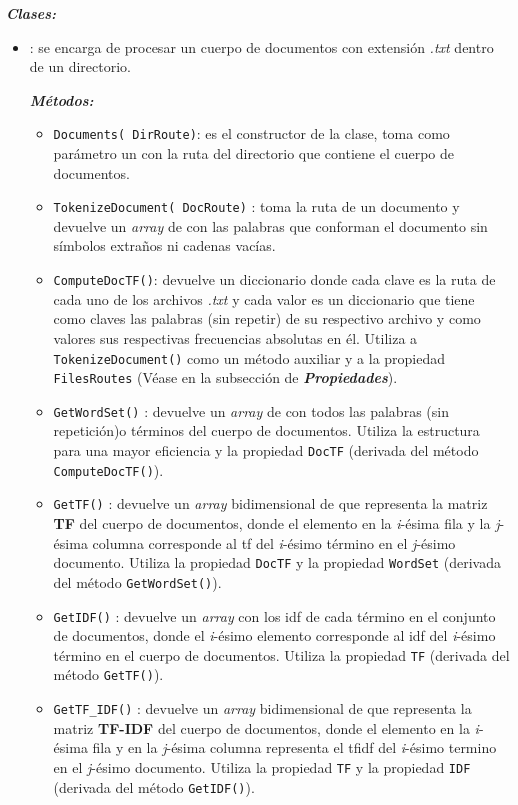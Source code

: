 \documentclass{article}
\begin{document}
\textbf{\textit{Clases:}}
\begin{itemize}
\item {} : se encarga de procesar un cuerpo de documentos con extensión \textit{.txt} dentro de un directorio.

\textbf{\textit{Métodos:}}
\begin{itemize}
\item \texttt{Documents( \texttt{DirRoute})}: es el constructor de la clase, toma como parámetro un  con la ruta del directorio que contiene el cuerpo de documentos. 
\item \texttt{TokenizeDocument( \texttt{DocRoute})} : toma la ruta de un documento y devuelve un \textit{array} de  con las palabras que conforman el documento sin símbolos extraños ni cadenas vacías.
\item \texttt{ComputeDocTF()}: devuelve un diccionario donde cada clave es la ruta de cada uno de los archivos \textit{.txt} y cada valor es un  diccionario que tiene como
claves las palabras (sin repetir) de su respectivo archivo y como valores sus respectivas frecuencias
absolutas en él. Utiliza a \texttt{TokenizeDocument()} como un método auxiliar y a la propiedad \texttt{FilesRoutes} (Véase en la subsección de \textit{\textbf{Propiedades}}).
\item \texttt{GetWordSet()} :  devuelve un \textit{array} de  con todos las palabras (sin repetición)o términos del cuerpo de documentos. Utiliza la estructura  para una mayor eficiencia y la propiedad \texttt{DocTF} (derivada del método \texttt{ComputeDocTF()}).
\item \texttt{GetTF()} : devuelve un \textit{array} bidimensional de  que representa la matriz \textbf{TF} del cuerpo de documentos, donde el elemento en la \textit{i}-ésima fila y la \textit{j}-ésima columna corresponde al tf del \textit{i}-ésimo término en el \textit{j}-ésimo documento. Utiliza la propiedad \texttt{DocTF} y la propiedad \texttt{WordSet} (derivada del método \texttt{GetWordSet()}).
\item \texttt{GetIDF()} : devuelve un \textit{array} con los idf de cada término en el conjunto de documentos, donde el \textit{i}-ésimo elemento corresponde al idf del \textit{i}-ésimo término en el cuerpo de documentos. Utiliza la propiedad \texttt{TF} (derivada del método \texttt{GetTF()}).
\item \texttt{GetTF\_IDF()} : devuelve un \textit{array} bidimensional de  que representa la matriz \textbf{TF-IDF} del cuerpo de documentos, donde el elemento en la \textit{i}-ésima fila y en la \textit{j}-ésima columna representa el tfidf del \textit{i}-ésimo termino en el \textit{j}-ésimo documento. Utiliza la propiedad \texttt{TF} y la propiedad \texttt{IDF} (derivada del método \texttt{GetIDF()}).

\end{itemize}
\end{itemize}
\end{document}
